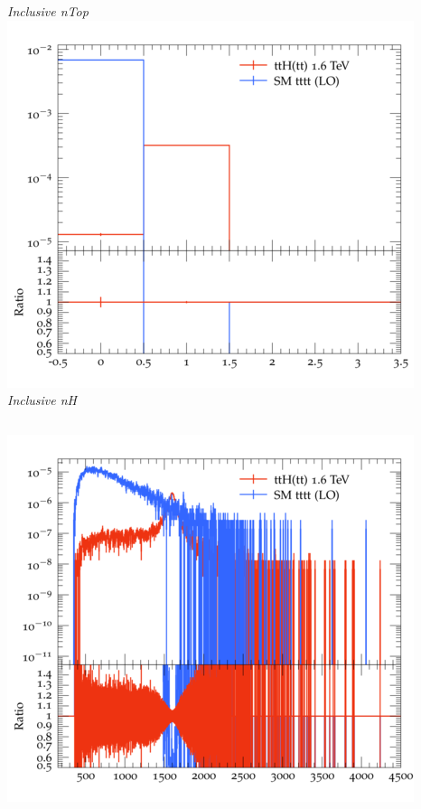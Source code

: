 \documentclass{beamer}
\begin{document}
\begin{frame}
\begin{columns}
\textit{\small Inclusive nTop}
\includegraphics[width=\textwidth]{../plots/ttH_1600/tttt_ttH/Inclusive_nH.png}\\
\textit{\small Inclusive nH}
\end{columns}
\begin{columns}
\includegraphics[width=\textwidth]{../plots/ttH_1600/tttt_ttH/Inclusive_InvM_ttbar12.png}\\

\end{columns}
\end{frame}
\end{document}
